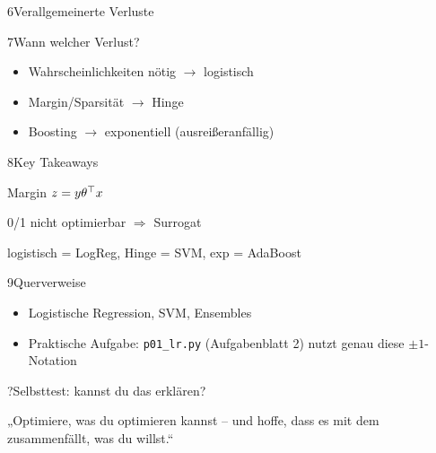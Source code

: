 \begin{hngrid}
\begin{hnp}[raster multicolumn=3,acc=hnrose]{6}{Verallgemeinerte Verluste}
\end{hnp}
%
\begin{hnp}[raster multicolumn=2,acc=hngreen]{7}{Wann welcher Verlust?}
\begin{itemize}
\item Wahrscheinlichkeiten nötig $\to$ logistisch
\item Margin/Sparsität $\to$ Hinge
\item Boosting $\to$ exponentiell (ausreißeranfällig)
\end{itemize}
\end{hnp}
%
\begin{hnp}[raster multicolumn=2,acc=hnorange]{8}{Key Takeaways}
\begin{hnchk}
\item Margin $z=y\theta^{\top} x$
\item 0/1 nicht optimierbar $\Rightarrow$ Surrogat
\item logistisch = LogReg, Hinge = SVM, exp = AdaBoost
\end{hnchk}
\end{hnp}
%
\begin{hnp}[raster multicolumn=2,acc=hnteal]{9}{Querverweise}
\begin{itemize}
\item Logistische Regression, SVM, Ensembles
\item Praktische Aufgabe: \texttt{p01\_lr.py} (Aufgabenblatt 2) nutzt genau diese $\pm1$-Notation
\end{itemize}
\end{hnp}
%
\begin{hnp}[raster multicolumn=6,acc=hnpurple,colback=hnlilac!30]{?}{Selbsttest: kannst du das erklären?}
\end{hnp}
%
\begin{hnbanner}[raster multicolumn=6]
„Optimiere, was du optimieren kannst -- und hoffe, dass es mit dem zusammenfällt, was du willst.“
\end{hnbanner}
\end{hngrid}
